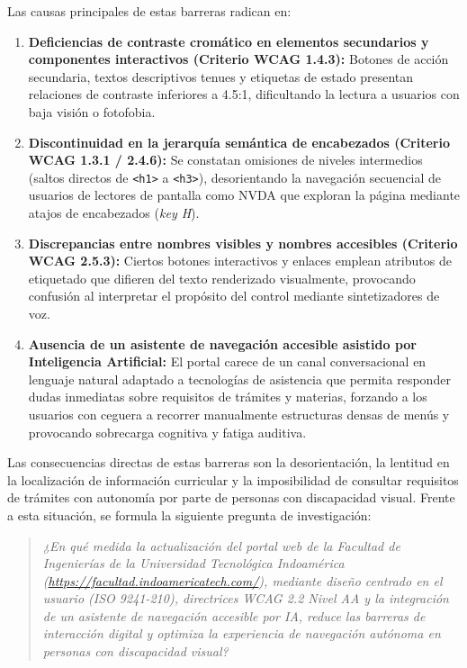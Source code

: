 Las causas principales de estas barreras radican en:
\begin{enumerate}
  \item \textbf{Deficiencias de contraste cromático en elementos secundarios y componentes interactivos (Criterio WCAG 1.4.3):} Botones de acción secundaria, textos descriptivos tenues y etiquetas de estado presentan relaciones de contraste inferiores a 4.5:1, dificultando la lectura a usuarios con baja visión o fotofobia.
  \item \textbf{Discontinuidad en la jerarquía semántica de encabezados (Criterio WCAG 1.3.1 / 2.4.6):} Se constatan omisiones de niveles intermedios (saltos directos de \texttt{<h1>} a \texttt{<h3>}), desorientando la navegación secuencial de usuarios de lectores de pantalla como NVDA que exploran la página mediante atajos de encabezados (\textit{key H}).
  \item \textbf{Discrepancias entre nombres visibles y nombres accesibles (Criterio WCAG 2.5.3):} Ciertos botones interactivos y enlaces emplean atributos de etiquetado que difieren del texto renderizado visualmente, provocando confusión al interpretar el propósito del control mediante sintetizadores de voz.
  \item \textbf{Ausencia de un asistente de navegación accesible asistido por Inteligencia Artificial:} El portal carece de un canal conversacional en lenguaje natural adaptado a tecnologías de asistencia que permita responder dudas inmediatas sobre requisitos de trámites y materias, forzando a los usuarios con ceguera a recorrer manualmente estructuras densas de menús y provocando sobrecarga cognitiva y fatiga auditiva.
\end{enumerate}

Las consecuencias directas de estas barreras son la desorientación, la lentitud en la localización de información curricular y la imposibilidad de consultar requisitos de trámites con autonomía por parte de personas con discapacidad visual. Frente a esta situación, se formula la siguiente pregunta de investigación:

\begin{quote}
\textit{¿En qué medida la actualización del portal web de la Facultad de Ingenierías de la Universidad Tecnológica Indoamérica (\url{https://facultad.indoamericatech.com/}), mediante diseño centrado en el usuario (ISO 9241-210), directrices WCAG 2.2 Nivel AA y la integración de un asistente de navegación accesible por IA, reduce las barreras de interacción digital y optimiza la experiencia de navegación autónoma en personas con discapacidad visual?}
\end{quote}

